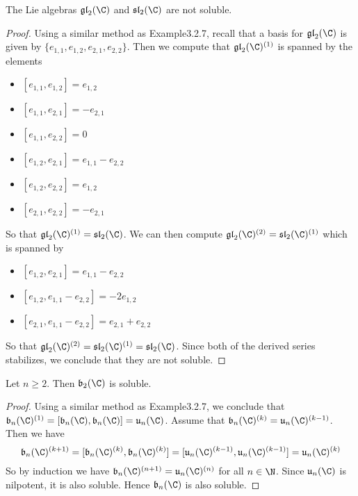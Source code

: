 \documentclass[a4paper]{article}
\begin{document}
\begin{eg}{}{} The Lie algebras $\mathfrak{gl}_2(\C)$ and $\mathfrak{sl}_2(\C)$ are not soluble. \tcbline
\begin{proof}
Using a similar method as Example3.2.7, recall that a basis for $\mathfrak{gl}_2(\C)$ is given by $\{e_{1,1},e_{1,2},e_{2,1},e_{2,2}\}$. Then we compute that $\mathfrak{gl}_2(\C)^{(1)}$ is spanned by the elements
\begin{itemize}
\item $[e_{1,1},e_{1,2}]=e_{1,2}$
\item $[e_{1,1},e_{2,1}]=-e_{2,1}$
\item $[e_{1,1},e_{2,2}]=0$
\item $[e_{1,2},e_{2,1}]=e_{1,1}-e_{2,2}$
\item $[e_{1,2},e_{2,2}]=e_{1,2}$
\item $[e_{2,1},e_{2,2}]=-e_{2,1}$
\end{itemize}
So that $\mathfrak{gl}_2(\C)^{(1)}=\mathfrak{sl}_2(\C)$. We can then compute $\mathfrak{gl}_2(\C)^{(2)}=\mathfrak{sl}_2(\C)^{(1)}$ which is spanned by 
\begin{itemize}
\item $[e_{1,2},e_{2,1}]=e_{1,1}-e_{2,2}$
\item $[e_{1,2},e_{1,1}-e_{2,2}]=-2e_{1,2}$
\item $[e_{2,1},e_{1,1}-e_{2,2}]=e_{2,1}+e_{2,2}$
\end{itemize}
So that $\mathfrak{gl}_2(\C)^{(2)}=\mathfrak{sl}_2(\C)^{(1)}=\mathfrak{sl}_2(\C)$. Since both of the derived series stabilizes, we conclude that they are not soluble. 
\end{proof}
\end{eg}

\begin{eg}{}{} Let $n\geq 2$. Then $\mathfrak{b}_2(\C)$ is soluble. \tcbline
\begin{proof}
Using a similar method as Example3.2.7, we conclude that $\mathfrak{b}_n(\C)^{(1)}=[\mathfrak{b}_n(\C),\mathfrak{b}_n(\C)]=\mathfrak{u}_n(\C)$. Assume that $\mathfrak{b}_n(\C)^{(k)}=\mathfrak{u}_n(\C)^{(k-1)}$. Then we have $$\mathfrak{b}_n(\C)^{(k+1)}=[\mathfrak{b}_n(\C)^{(k)},\mathfrak{b}_n(\C)^{(k)}]=[\mathfrak{u}_n(\C)^{(k-1)},\mathfrak{u}_n(\C)^{(k-1)}]=\mathfrak{u}_n(\C)^{(k)}$$ So by induction we have $\mathfrak{b}_n(\C)^{(n+1)}=\mathfrak{u}_n(\C)^{(n)}$ for all $n\in\N$. Since $\mathfrak{u}_n(\C)$ is nilpotent, it is also soluble. Hence $\mathfrak{b}_n(\C)$ is also soluble. 
\end{proof}
\end{eg}
\end{document}
